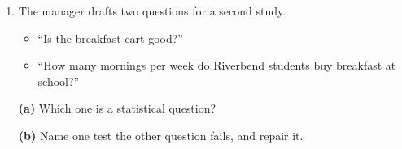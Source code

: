 \documentclass[10pt]{article}
\begin{document}
\begin{tcolorbox}[colback=white, colframe=black!40, breakable,
    title=\textbf{Part 1 --- Run the cycle},
    fonttitle=\bfseries, arc=2mm, left=3mm, right=3mm, top=2mm, bottom=2mm]
\begin{enumerate}[leftmargin=1.6em, itemsep=6pt, topsep=4pt]
        Variable: \blank{6cm} \hfill Type: \blank{3cm}

  \item The manager drafts two questions for a second study.

        \begin{itemize}[leftmargin=1.6em, itemsep=2pt, topsep=2pt]
          \item[\textbf{A.}] ``Is the breakfast cart good?''
          \item[\textbf{B.}] ``How many mornings per week do Riverbend students
                buy breakfast at school?''
        \end{itemize}

        \textbf{(a)} Which one is a statistical question? \blank{1.5cm}

        \textbf{(b)} Name one test the other question fails, and repair it.
        \writeline

\end{enumerate}
\end{tcolorbox}

\vspace{0.08in}
\end{document}
